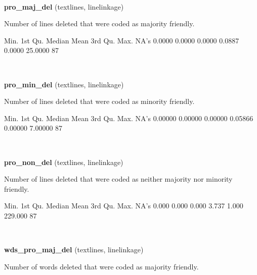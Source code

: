 \documentclass[]{article}
\newenvironment{Shaded}{\begin{snugshade}}{\end{snugshade}}
\newcommand{\StringTok}[1]{\textcolor[rgb]{0.31,0.60,0.02}{{#1}}}
\newcommand{\NormalTok}[1]{{#1}}
\begin{document}
~

\vspace{1em}

\textbf{pro\_maj\_del} (textlines, linelinkage)

Number of lines deleted that were coded as majority friendly.

\begin{Shaded}
\begin{Highlighting}[]
   \NormalTok{Min. 1st Qu.  Median    Mean 3rd Qu.    Max.    NA}\StringTok{'s }
\StringTok{ 0.0000  0.0000  0.0000  0.0887  0.0000 25.0000      87 }
\end{Highlighting}
\end{Shaded}

~

\vspace{1em}

\textbf{pro\_min\_del} (textlines, linelinkage)

Number of lines deleted that were coded as minority friendly.

\begin{Shaded}
\begin{Highlighting}[]
   \NormalTok{Min. 1st Qu.  Median    Mean 3rd Qu.    Max.    NA}\StringTok{'s }
\StringTok{0.00000 0.00000 0.00000 0.05866 0.00000 7.00000      87 }
\end{Highlighting}
\end{Shaded}

~

\vspace{1em}

\textbf{pro\_non\_del} (textlines, linelinkage)

Number of lines deleted that were coded as neither majority nor minority
friendly.

\begin{Shaded}
\begin{Highlighting}[]
   \NormalTok{Min. 1st Qu.  Median    Mean 3rd Qu.    Max.    NA}\StringTok{'s }
\StringTok{  0.000   0.000   0.000   3.737   1.000 229.000      87 }
\end{Highlighting}
\end{Shaded}

~

\vspace{1em}

\textbf{wds\_pro\_maj\_del} (textlines, linelinkage)

Number of words deleted that were coded as majority friendly.
\end{document}
